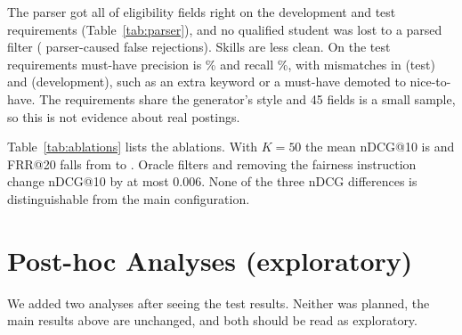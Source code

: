 \documentclass[conference]{IEEEtran}
\begin{document}
The parser got all \ParserEligFieldsCorrect{} of \ParserEligFieldsTotal{} eligibility fields right on the development and test requirements (Table~\ref{tab:parser}), and no qualified student was lost to a parsed filter (\ParserFalseRej{} parser-caused false rejections). Skills are less clean. On the test requirements must-have precision is \ParserTestMustPrecPct{}\% and recall \ParserTestMustRecPct{}\%, with mismatches in \ParserTestMismatchReqs{} (test) and \ParserDevMismatchReqs{} (development), such as an extra keyword or a must-have demoted to nice-to-have. The requirements share the generator's style and 45 fields is a small sample, so this is not evidence about real postings.

Table~\ref{tab:ablations} lists the ablations. With $K=50$ the mean nDCG@10 is \PropKfiftyNdcgCi{} and FRR@20 falls from \PropFrrtwentyMean{} to \PropKfiftyFrrtwentyMean{}. Oracle filters and removing the fairness instruction change nDCG@10 by at most 0.006. None of the three nDCG differences is distinguishable from the main configuration.
\begin{table}[t]
\caption{Parser accuracy against the structured truth: exact match on the three eligibility fields, and precision and recall of the must-have skills after normalisation.}
\label{tab:parser}
\centering\scriptsize
\resizebox{\columnwidth}{!}{}
\end{table}

\begin{table}[t]
\caption{Pre-declared ablations of the proposed method (K=50, oracle eligibility filters, no fairness instruction); means over the test requirements. None is distinguishable from the main configuration in nDCG@10. MRR is 1.000 for all variants except the fairness-off run (0.950); FRR@10 equals one minus capped Recall@10.}
\label{tab:ablations}
\centering\footnotesize

\end{table}

\section{Post-hoc Analyses (exploratory)}
\label{sec:posthoc}
We added two analyses after seeing the test results. Neither was planned, the main results above are unchanged, and both should be read as exploratory.
\end{document}
